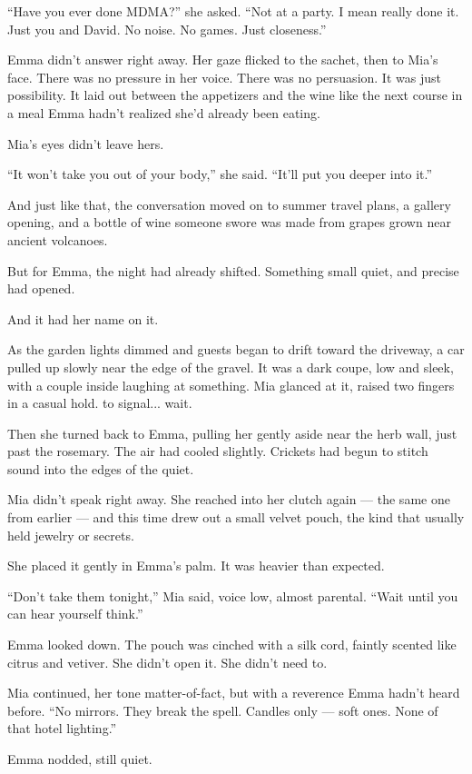 ``Have you ever done MDMA?'' she asked. ``Not at a party. I mean really done it. Just you and David. No noise. 
No games. Just closeness.''

Emma didn’t answer right away. Her gaze flicked to the sachet, then to Mia’s face. There was no pressure in 
her voice. There was no persuasion. It was just possibility. It laid out between the appetizers and the wine 
like the next course in a meal Emma hadn’t realized she’d already been eating.

Mia’s eyes didn’t leave hers.

``It won’t take you out of your body,'' she said. ``It’ll put you deeper into it.''

And just like that, the conversation moved on to summer travel plans, a gallery opening, 
and a bottle of wine someone swore was made from grapes grown near ancient volcanoes.

But for Emma, the night had already shifted. Something small quiet, and precise had opened. 

And it had her name on it.

As the garden lights dimmed and guests began to drift toward the driveway, a car pulled up 
slowly near the edge of the gravel. It was a dark coupe, low and sleek, with a couple inside 
laughing 
at something. Mia glanced at it, raised two fingers in a casual hold. 
to signal... wait.

Then she turned back to Emma, pulling her gently aside near the herb wall, just past the 
rosemary. The air had cooled slightly. Crickets had begun to stitch sound into the edges of the quiet.

Mia didn’t speak right away. She reached into her clutch again — the same one from earlier — and 
this time drew out a small velvet pouch, the kind that usually held jewelry or secrets.

She placed it gently in Emma’s palm. It was heavier than expected.

``Don’t take them tonight,'' Mia said, voice low, almost parental. ``Wait until
you can hear yourself think.''

Emma looked down. The pouch was cinched with a silk cord, faintly scented like
citrus and vetiver. She didn’t open it. She didn’t need to.

Mia continued, her tone matter-of-fact, but with a reverence Emma hadn’t heard
before. ``No mirrors. They break the spell. Candles only --- soft ones. None of
that hotel lighting.''

Emma nodded, still quiet.

